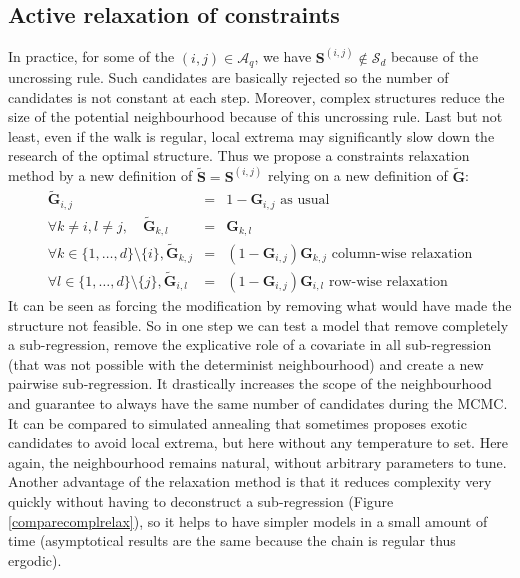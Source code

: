 \documentclass[12pt,a4paper]{report}
\begin{document}
		\subsection{Active relaxation of constraints}
		In practice, for some of the $(i,j) \in \mathcal{A}_q$, we have $\boldsymbol{S}^{(i,j)}\notin \mathcal{S}_d$ because of the uncrossing rule. Such candidates are basically rejected so the number of candidates is not constant at each step. Moreover, complex structures reduce the size of the potential neighbourhood because of this uncrossing rule. Last but not least, even if the walk is regular, local extrema may significantly slow down the research of the optimal structure.
		Thus we propose a constraints relaxation method by a new definition of $\tilde{\boldsymbol{S}}=\boldsymbol{S}^{(i,j)}$ relying on a new definition of $\tilde{\boldsymbol{G}}$:
	\begin{eqnarray}
		\tilde{\boldsymbol{G}}_{i,j}&=&1-\boldsymbol{G}_{i,j} \textrm{ as usual}\\
		\forall k \neq i, l\neq j, \quad	\tilde{\boldsymbol{G}}_{k,l}&=&\boldsymbol{G}_{k,l} \\
		\forall k \in \{1,\dots,d\}\setminus \{i\}, \tilde{\boldsymbol{G}}_{k,j}&=&(1-\boldsymbol{G}_{i,j})\boldsymbol{G}_{k,j} \textrm{ column-wise relaxation} \\
		\forall l \in \{1,\dots,d\}\setminus \{j\}, \tilde{\boldsymbol{G}}_{i,l}&=&(1-\boldsymbol{G}_{i,j})\boldsymbol{G}_{i,l} \textrm{ row-wise relaxation}
	\end{eqnarray}
	It can be seen as forcing the modification by removing what would have made the structure not feasible. So in one step we can test a model that remove completely a sub-regression, remove the explicative role of a covariate in all sub-regression (that was not possible with the determinist neighbourhood) and create a new pairwise sub-regression. It drastically increases the scope of the neighbourhood and guarantee to always have the same number of candidates during the MCMC. It can be compared to simulated annealing that sometimes proposes exotic candidates to avoid local extrema, but here without any temperature to set. Here again, the neighbourhood remains natural, without arbitrary parameters to tune. 
	Another advantage of the relaxation method is that it reduces complexity very quickly without having to deconstruct a sub-regression (Figure \ref{comparecomplrelax}), so it helps to have simpler models in a small amount of time (asymptotical results are the same because the chain is regular thus ergodic).\\
			
\end{document}
